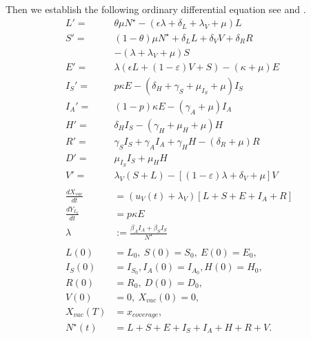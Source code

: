 Then we establish
the following ordinary differential equation see 
and .
\begin{equation}
    \label{eqn:vacination_dynamics}
    \begin{aligned}
        L' =&  \theta \mu N^{\star}
                -(\epsilon \lambda + \delta_L + \lambda_V +\mu) L
        \\
        S' =&
            (1 - \theta) \mu N^\star
            + \delta_L L
            + \delta_V V
            + \delta_R R
            \\
            &-
            \left(
                \lambda + \lambda_V + \mu
            \right) S
        \\
        E' =&
                \lambda (\epsilon L + (1-\varepsilon) V + S)
                - (\kappa + \mu) E
        \\
        I_S' =&
            p \kappa E
            -
            (
                \delta_H +
                \gamma_S +
                \mu_{I_S} +
                \mu
            ) I_S
        \\
        I_A' = &
                (1 - p) \kappa E - (\gamma_A + \mu) I_A
        \\
        H' = &
            \delta_H I_S - (\gamma_H + \mu_H + \mu) H
        \\
        R' = &
            \gamma_S I_S +
            \gamma_A I_A +
            \gamma_H H
                - (\delta_R + \mu) R
        \\
        D'  = &
                \mu_{I_S} I_S + \mu_H H
        \\
        V' = &
            \lambda_V  (S + L)
            - \left[
                (1 - \varepsilon) \lambda
                + \delta_V
                + \mu
            \right ] V
        \\
        \\
            \frac{dX_{vac}}{dt}
                &=
                (u_V(t) + \lambda_V)
                \left[
                    L + S + E + I_A + R
                \right]
        \\
            \frac{d Y_{I_S}}{dt}
                & = p \kappa E
        \\
            \lambda &:=
                \frac{\beta_A I_A + \beta_S I_S}{N^{\star}}
        \\
        \\
            L(0) &= L_0,
            \ S(0) = S_0,
            \ E(0) = E_0,
        \\
            I_S(0) &= I_{S_{0}},
            I_A(0) = I_{A_{0}},
            H(0) = H_0,
        \\
            R(0) &= R_0, \ D(0) = D_0,
      \\
            V(0) &= 0, \ X_{vac}(0) = 0, \quad
      \\
            X_{vac}(T) &= x_{coverage},
      \\
            N^{\star}(t) &=
                L + S +E + I_S + I_A +
                H + R + V .
        \end{aligned}
\end{equation}
